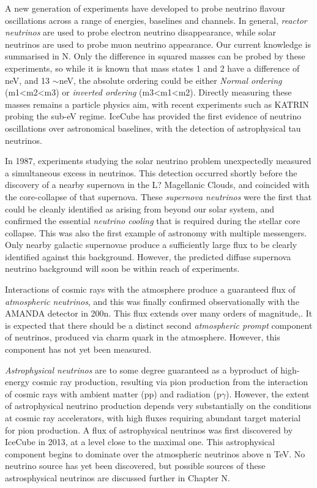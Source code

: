A new generation of experiments have developed to probe neutrino flavour oscillations across a range of energies, baselines and channels. In general, \emph{reactor neutrinos} are used to probe electron neutrino disappearance, while solar neutrinos are used to probe muon neutrino appearance. Our current knowledge is summarised in N. Only the difference in squared masses can be probed by these experiments, so while it is known that mass states 1 and 2 have a difference of neV, and 13 $\sim$neV, the absolute ordering could be either \emph{Normal ordering} (m1<m2<m3) or \emph{inverted ordering} (m3<m1<m2). Directly measuring these masses remains a particle physics aim, with recent experiments such as KATRIN probing the sub-eV regime. IceCube has provided the first evidence of neutrino oscillations over astronomical baselines, with the detection of astrophysical tau neutrinos.

In 1987, experiments studying the solar neutrino problem unexpectedly measured a simultaneous excess in neutrinos. This detection occurred shortly before the discovery of a nearby supernova in the L? Magellanic Clouds, and coincided with the core-collapse of that supernova. These \emph{supernova neutrinos} were the first that could be cleanly identified as arising from beyond our solar system, and confirmed the essential \emph{neutrino cooling} that is required during the stellar core collapse. This was also the first example of astronomy with multiple messengers. Only nearby galactic supernovae produce a sufficiently large flux to be clearly identified against this background. However, the predicted diffuse supernova neutrino background will soon be within reach of experiments.

Interactions of cosmic rays with the atmosphere produce a guaranteed flux of \emph{atmospheric neutrinos}, and this was finally confirmed observationally with the AMANDA detector in 200n. This flux extends over many orders of magnitude,. It is expected that there should be a distinct second \emph{atmospheric prompt} component of neutrinos, produced via charm quark in the atmosphere. However, this component has not yet been measured.

\emph{Astrophysical neutrinos} are to some degree guaranteed as a byproduct of high-energy cosmic ray production, resulting via pion production from the interaction of cosmic rays with ambient matter (pp) and radiation (p$\gamma$). However, the extent of astrophysical neutrino production depends very substantially on the conditions at cosmic ray accelerators, with high fluxes requiring abundant target material for pion production. A flux of astrophysical neutrinos was first discovered by IceCube in 2013, at a level close to the maximal one. This astrophysical component begins to dominate over the atmospheric neutrinos above n TeV. No neutrino source has yet been discovered, but possible sources of these astrosphysical neutrinos are discussed further in Chapter N.

